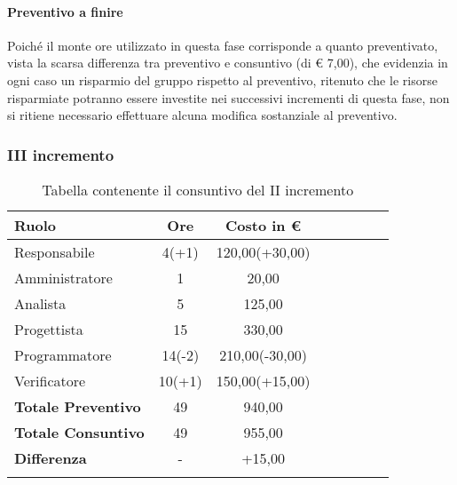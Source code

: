 \paragraph{Preventivo a finire}
Poiché il monte ore utilizzato in questa fase corrisponde a quanto preventivato, vista la scarsa differenza tra preventivo e consuntivo (di € 7,00), che evidenzia in ogni caso un risparmio del gruppo rispetto al preventivo, ritenuto che le risorse risparmiate potranno essere investite nei successivi incrementi di questa fase, non si ritiene necessario effettuare alcuna modifica sostanziale al preventivo.

\subsubsection{III incremento}
\begin{longtable}{|l|c|c|c|c|c|c|c|}
	\hline
	\rowcolor{lighter-grayer}
	\textbf{Ruolo}             & \textbf{Ore} & \textbf{Costo in €} \\
	\hline
	\endfirsthead

	\hline
	Responsabile               & 4(+1)           & 120,00(+30,00)              \\
	\hline
	\hline
	Amministratore             & 1       & 20,00      \\
	\hline
	\hline
	Analista                   & 5       & 125,00   \\
	\hline
	\hline
	Progettista                & 15            & 330,00              \\
	\hline
	\hline
	Programmatore              & 14(-2)            & 210,00(-30,00)                   \\
	\hline
	\hline
	Verificatore               & 10(+1)       & 150,00(+15,00)    \\
	\hline
	\textbf{Totale Preventivo} & 49          & 940,00            \\
	\hline
	\hline
	\textbf{Totale Consuntivo} & 49          & 955,00            \\
	\hline
	\hline
	\textbf{Differenza}        & -           & +15,00           \\
	\hline
	\rowcolor{white}
	\caption{Tabella contenente il consuntivo del II incremento}
\end{longtable}
